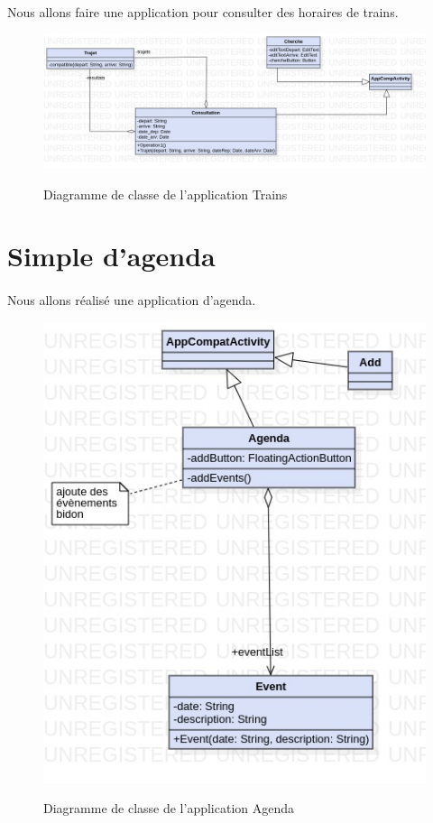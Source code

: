 \documentclass[a4paper]{article}
\begin{document}
\begin{multicols}{2}
    \paragraph{}
      Nous allons faire une application pour consulter des horaires de trains.
    \begin{figure}
      \centering
      \caption{Diagramme de classe de l'application Trains}
      \includegraphics[width=\textwidth]{jpg/Model1!Train_1}
      \label{fig:manifestHelloWorld}
    \end{figure}
  \section{Simple d’agenda}
    \paragraph{}
      Nous allons réalisé une application d'agenda.
    \begin{figure}
      \centering
      \caption{Diagramme de classe de l'application Agenda}
      \includegraphics[width=\textwidth]{jpg/Model!Agenda_0}
      \label{fig:manifestHelloWorld}
    \end{figure}
  \end{multicols}
\end{document}
